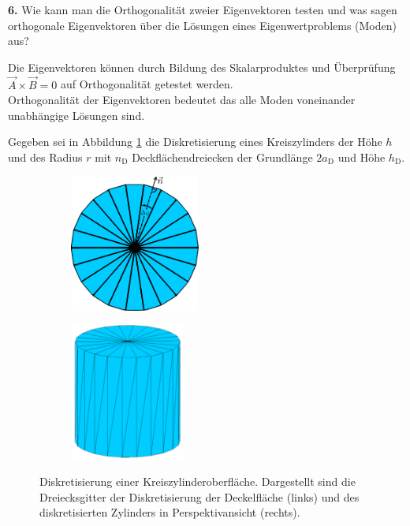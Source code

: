 \documentclass[Protokollheft.tex]{subfiles}
\begin{document}
    \begin{framed}
	\noindent \textbf{6.} Wie kann man die Orthogonalität zweier Eigenvektoren testen und was sagen orthogonale Eigenvektoren über die Lösungen eines Eigenwertproblems (Moden) aus?\label{exer:orthogonalEV}
\end{framed}



Die Eigenvektoren können durch Bildung des Skalarproduktes und Überprüfung $\vec{A} \times \vec{B} = 0$ auf Orthogonalität getestet werden. \\
Orthogonalität der Eigenvektoren bedeutet das alle Moden  voneinander unabhängige Lösungen sind. 


    \noindent Gegeben sei in Abbildung \ref{fig:zylGitter} die Diskretisierung eines Kreiszylinders der Höhe $h$ und des Radius $r$ mit $n_\mathrm{D}$ Deckflächendreiecken der Grundlänge $2a_\text{D}$ und Höhe $h_\text{D}$.\\
	\begin{figure}[h]
		\centering
		\begin{subfigure}{0.49\textwidth}
			\centering
			\includegraphics[height=4.5cm]{v1_zylinder1.pdf}
		\end{subfigure}
		\begin{subfigure}{0.49\textwidth}
			\centering
			\includegraphics[height=4.5cm]{v1_zylinder2.pdf}
		\end{subfigure}
		\caption{Diskretisierung einer Kreiszylinderoberfläche. Dargestellt sind die Dreiecksgitter der Diskretisierung der Deckelfläche (links) und des diskretisierten Zylinders in Perspektivansicht (rechts).}\label{fig:zylGitter}
	\end{figure}
\end{document}
